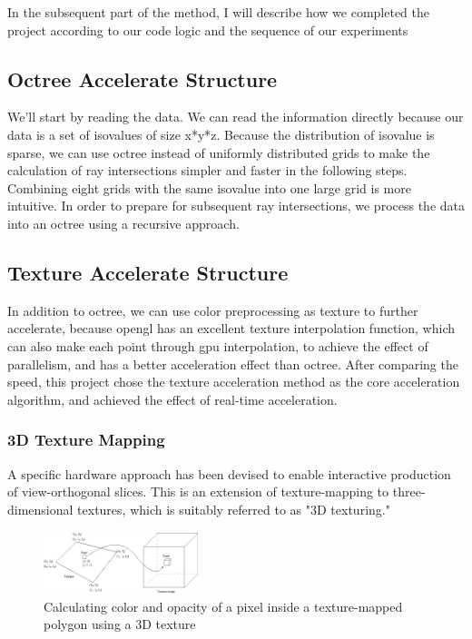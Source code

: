 \documentclass[sigconf]{acmart}
\begin{document}

In the subsequent part of the method, I will describe how we completed the project according to our code logic and the sequence of our experiments

\subsection{Octree Accelerate Structure}
We'll start by reading the data. We can read the information directly because our data is a set of isovalues of size x*y*z. Because the distribution of isovalue is sparse, we can use octree instead of uniformly distributed grids to make the calculation of ray intersections simpler and faster in the following steps. Combining eight grids with the same isovalue into one large grid is more intuitive. In order to prepare for subsequent ray intersections, we process the data into an octree using a recursive approach.

\subsection{Texture Accelerate Structure}
In addition to octree, we can use color preprocessing as texture to further accelerate, because opengl has an excellent texture interpolation function, which can also make each point through gpu interpolation, to achieve the effect of parallelism, and has a better acceleration effect than octree. After comparing the speed, this project chose the texture acceleration method as the core acceleration algorithm, and achieved the effect of real-time acceleration.\cite{httpsdev38:online}

\subsubsection{3D Texture Mapping}
A specific hardware approach has been devised to enable interactive production of view-orthogonal slices. This is an extension of texture-mapping to three-dimensional textures, which is suitably referred to as "3D texturing."
\begin{figure}
    \centering
    \includegraphics[width=0.4\textwidth]{imgs/TextureMapping3D.png}
    \caption{Calculating color and opacity of a pixel inside a texture-mapped polygon using a 3D texture}
    \label{fig:texture3d}
\end{figure}
\end{document}
